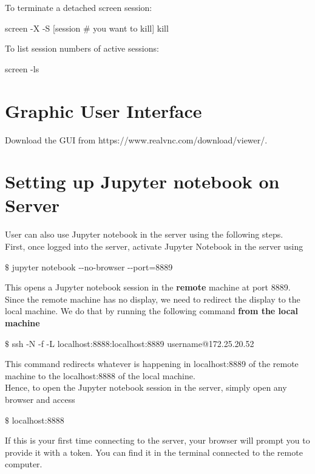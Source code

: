 To terminate a detached screen session:
\begin{mdframed}
screen -X -S [session \# you want to kill] kill
\end{mdframed}

To list session numbers of active sessions:
\begin{mdframed}
screen -ls
\end{mdframed}

\section{Graphic User Interface}

Download the GUI from https://www.realvnc.com/download/viewer/.\\

\section{Setting up Jupyter notebook on Server}
User can also use Jupyter notebook in the server using the following steps.\\

First, once logged into the server, activate Jupyter Notebook in the server using

\begin{framed}
$\$$ jupyter notebook -{}-no-browser -{}-port=8889
\end{framed}

This opens a Jupyter notebook session in the \textbf{remote} machine at port 8889. Since the remote machine has no display, we need to redirect the display to the local machine. We do that by running the following command \textbf{from the local machine}

\begin{framed}
$\$$ ssh -N -f -L localhost:8888:localhost:8889 username@172.25.20.52
\end{framed}

This command redirects whatever is happening in localhost:8889 of the remote machine to the localhost:8888 of the local machine. \\

Hence, to open the Jupyter notebook session in the server, simply open any browser and access

\begin{framed}
$\$$ localhost:8888
\end{framed}

If this is your first time connecting to the server, your browser will prompt you to provide it with a token. You can find it in the terminal connected to the remote computer.

